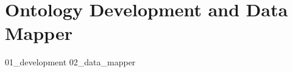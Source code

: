 \chapter{Ontology Development and Data Mapper}
\label{chp:development-mapper}

{01_development}%
{02_data_mapper}%